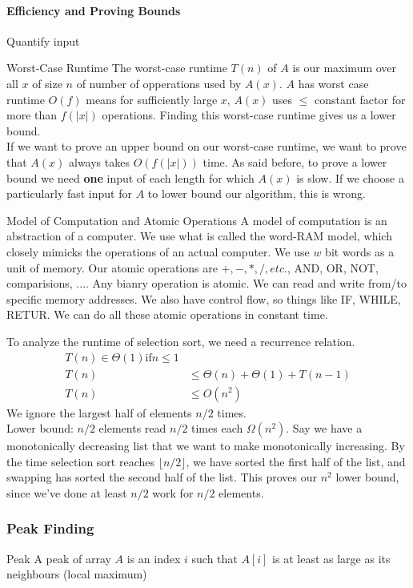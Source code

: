 \documentclass[11pt]{article}
\begin{document}
\paragraph{Efficiency and Proving Bounds}
Quantify input
\begin{definitionbox}{Worst-Case Runtime}
    The worst-case runtime $T(n)$ of $A$ is our maximum over all $x$ of size $n$ of number of opperations used by $A(x)$. $A$ has worst case runtime $O(f)$ means for sufficiently large $x$, $A(x)$ uses $\leq$ constant factor for more than $f(|x|)$ operations. Finding this worst-case runtime gives us a lower bound.\\
    If we want to prove an upper bound on our worst-case runtime, we want to prove that $A(x)$ always takes $O(f(|x|))$ time. As said before, to prove a lower bound we need \textbf{one} input of each length for which $A(x)$ is slow. If we choose a particularly fast input for $A$ to lower bound our algorithm, this is wrong.
\end{definitionbox}
\begin{definitionbox}{Model of Computation and Atomic Operations}
    A model of computation is an abstraction of a computer. We use what is called the word-RAM model, which closely mimicks the operations of an actual computer. We use $w$ bit words as a unit of memory. Our atomic operations are $+,-,*,/, etc.$, AND, OR, NOT, comparisions, $...$. Any bianry operation is atomic. We can read and write from/to specific memory addresses. We also have control flow, so things like IF, WHILE, RETUR. We can do all these atomic operations in constant time.
\end{definitionbox}
To analyze the runtime of selection sort, we need a recurrence relation.
\begin{align*}
    T(n) \in \Theta(1) \text{if} n \leq 1 \\
    T(n) &\leq \Theta(n) + \Theta(1) + T(n-1) \\ 
    T(n) &\leq O(n^2)
\end{align*}
We ignore the largest half of elements $n/2$ times. \\
Lower bound: $n/2$ elements read $n/2$ times each $\Omega(n^2)$. Say we have a monotonically decreasing list that we want to make monotonically increasing. By the time selection sort reaches $\lfloor n/2 \rfloor$, we have sorted the first half of the list, and swapping has sorted the second half of the list. This proves our $n^2$ lower bound, since we've done at least $n/2$ work for $n/2$ elements.
\subsubsection{Peak Finding}
\begin{definitionbox}{Peak}
    A peak of array $A$ is an index $i$ such that $A[i]$ is at least as large as its neighbours (local maximum)
\end{definitionbox}
\end{document}
